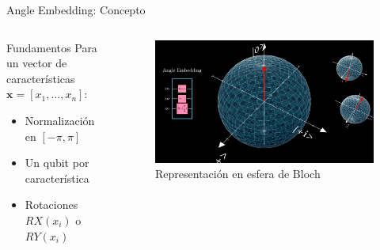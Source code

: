 \documentclass[aspectratio=169]{beamer}
\begin{document}
\begin{frame}{Angle Embedding: Concepto}
  \begin{columns}
    \begin{column}{0.4\textwidth}
      \begin{block}{Fundamentos}
        Para un vector de características $\mathbf{x}=[x_1,\dots,x_n]$:
        \begin{itemize}
          \item Normalización en $[-\pi,\pi]$
          \item Un qubit por característica
          \item Rotaciones $RX(x_i)$ o $RY(x_i)$
        \end{itemize}
      \end{block}
    \end{column}
    \begin{column}{0.6\textwidth}
      \begin{figure}
        \includegraphics[width=\textwidth]{blochh.png}
        \caption{Representación en esfera de Bloch}
      \end{figure}
    \end{column}
  \end{columns}
\end{frame}
\end{document}
